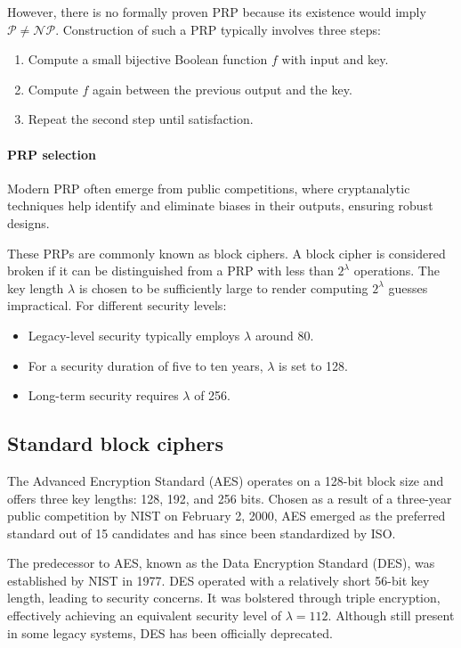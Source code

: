 However, there is no formally proven PRP because its existence would imply $\mathcal{P} \neq \mathcal{NP}$. 
Construction of such a PRP typically involves three steps:
\begin{enumerate}
    \item Compute a small bijective Boolean function $f$ with input and key.
    \item Compute $f$ again between the previous output and the key.
    \item Repeat the second step until satisfaction.
\end{enumerate}

\paragraph*{PRP selection}
Modern PRP often emerge from public competitions, where cryptanalytic techniques help identify and eliminate biases in their outputs, ensuring robust designs.

These PRPs are commonly known as block ciphers.
A block cipher is considered broken if it can be distinguished from a PRP with less than $2^\lambda$ operations.
The key length $\lambda$ is chosen to be sufficiently large to render computing $2^\lambda$ guesses impractical.
For different security levels:
\begin{itemize}
    \item Legacy-level security typically employs $\lambda$ around 80.
    \item For a security duration of five to ten years, $\lambda$ is set to 128.
    \item Long-term security requires $\lambda$ of 256.
\end{itemize}

\subsection{Standard block ciphers}
The Advanced Encryption Standard (AES) operates on a 128-bit block size and offers three key lengths: 128, 192, and 256 bits.
Chosen as a result of a three-year public competition by NIST on February 2, 2000, AES emerged as the preferred standard out of 15 candidates and has since been standardized by ISO.

The predecessor to AES, known as the Data Encryption Standard (DES), was established by NIST in 1977. 
DES operated with a relatively short 56-bit key length, leading to security concerns. 
It was bolstered through triple encryption, effectively achieving an equivalent security level of $\lambda=112$. 
Although still present in some legacy systems, DES has been officially deprecated.